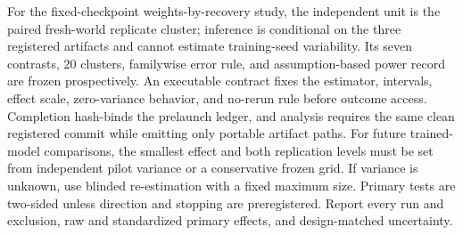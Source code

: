 \documentclass[11pt,a4paper]{article}
\begin{document}
For the fixed-checkpoint weights-by-recovery study, the independent unit is the
paired fresh-world replicate cluster; inference is conditional on the three
registered artifacts and cannot estimate training-seed variability. Its seven
contrasts, 20 clusters, familywise error rule, and assumption-based power record
are frozen prospectively. An executable contract fixes the estimator, intervals,
effect scale, zero-variance behavior, and no-rerun rule before outcome access.
Completion hash-binds the prelaunch ledger, and analysis requires the same clean
registered commit while emitting only portable artifact paths.
For future trained-model comparisons, the smallest effect and both replication
levels must be set from independent pilot variance or a conservative frozen
grid. If variance is unknown, use blinded re-estimation with a fixed maximum
size. Primary tests are two-sided unless direction and stopping are
preregistered. Report every run and exclusion, raw and standardized primary
effects, and design-matched uncertainty.
\end{document}
